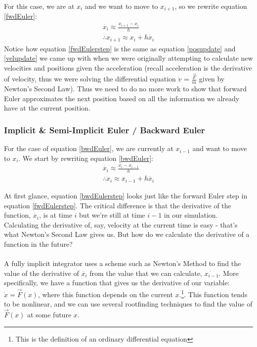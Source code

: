 \documentclass[]{article}
\begin{document}
For this case, we are at $x_i$ and we want to move to $x_{i+1}$, so we rewrite equation \ref{fwdEuler}:
\begin{eqnarray}
	\dot{x_i} \approx \frac{x_{i+1} - x_i}{h} \\
	\therefore x_{i+1} \approx x_{i} + h\dot{x_i} \label{fwdEulerstep}
\end{eqnarray}
Notice how equation \ref{fwdEulerstep} is the same as equation \ref{posupdate} and \ref{velupdate} we came up with when we were originally attempting to calculate new velocities and positions given the acceleration (recall acceleration is the derivative of velocity, thus we were solving the differential equation $\dot{v}$ = $\frac{\vec{F}}{m}$ given by Newton's Second Law). Thus we need to do no more work to show that forward Euler approximates the next position based on all the information we already have at the current position.

\subsubsection{Implicit \& Semi-Implicit Euler / Backward Euler}

For the case of equation \ref{bwdEuler}, we are currently at $x_{i-1}$ and want to move to $x_i$. We start by rewriting equation \ref{bwdEuler}:
\begin{eqnarray}
	\dot{x_i} \approx \frac{x_{i} - x_{i-1}}{h} \\
	\therefore x_i \approx x_{i-1} + h\dot{x_i} \label{bwdEulerstep}
\end{eqnarray}

At first glance, equation \ref{bwdEulerstep} looks just like the forward Euler step in equation \ref{fwdEulerstep}. The critical difference is that the derivative of the function, $\dot{x_i}$, is at time $i$ but we're still at time $i-1$ in our simulation. Calculating the derivative of, say, velocity at the current time is easy - that's what Newton's Second Law gives us. But how do we calculate the derivative of a function in the future?

\paragraph{}

A fully implicit integrator uses a scheme such as Newton's Method to find the value of the derivative of $\dot{x_i}$ from the value that we can calculate, $\dot{x_{i-1}}$. More specifically, we have a function that gives us the derivative of our variable: $\dot{x} = \vec{F}(x)$, where this function depends on the current $x$.\footnote{This is the definition of an ordinary differential equation}. This function tends to be nonlinear, and we can use several rootfinding techniques to find the value of $\vec{F}(x)$ at some future $x$. 
\end{document}
